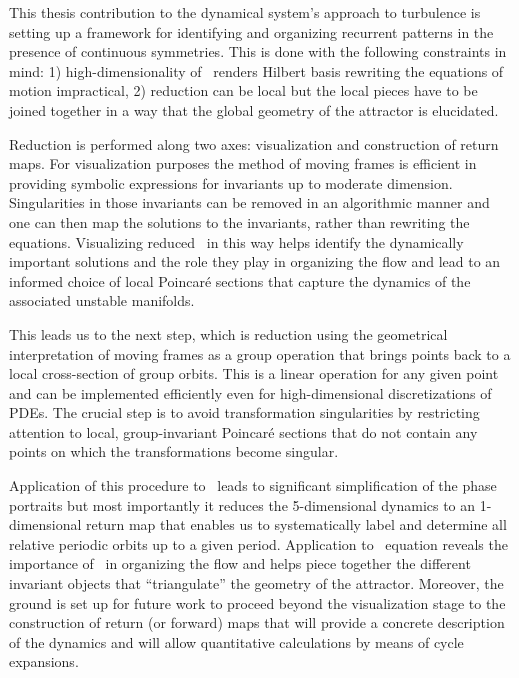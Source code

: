 
This thesis contribution to the dynamical system's approach to
turbulence is setting up a framework for identifying and
organizing recurrent patterns in the presence of continuous
symmetries. This is done with the following
constraints in mind: 1) high-dimensionality of \statesp\ renders
Hilbert basis rewriting the equations of motion impractical, 2) reduction
can be local but the local pieces have to be joined together in
a way that the global geometry of the attractor is elucidated.

Reduction is performed along two axes: visualization and construction of return maps.
For visualization purposes the method of moving frames is efficient in providing
symbolic expressions for invariants up to moderate dimension. Singularities
in those invariants can be removed in an algorithmic manner and one can then map the
solutions to the invariants, rather than rewriting the equations. Visualizing
reduced \statesp\ in this way helps identify the dynamically important solutions and the role they
play in organizing the flow and lead to an informed choice of local Poincar\'e sections
that capture the dynamics of the associated unstable manifolds.

This leads us to the next step, which is reduction using the geometrical interpretation
of moving frames as a group operation that brings points back to a local cross-section of
group orbits. This is a linear operation for any given point and can be implemented efficiently
even for high-dimensional discretizations of PDEs. The crucial step is to avoid transformation
singularities by restricting attention to local, group-invariant Poincar\'e sections that
do not contain any points on which the transformations become singular.

Application of this procedure to \CLe\ leads to significant
simplification of the phase portraits but most importantly it
reduces the 5-dimensional dynamics to an 1-dimensional return
map that enables us to systematically label and determine all
relative periodic orbits up to a given period. Application to
\KS\ equation reveals the importance of \reqva\ in
organizing the flow and helps piece together the different
invariant objects that ``triangulate'' the geometry of the
attractor. Moreover, the ground is set up for future work to
proceed beyond the visualization stage to the construction of
return (or forward) maps that will provide a concrete
description of the dynamics and will allow quantitative
calculations by means of cycle expansions.


